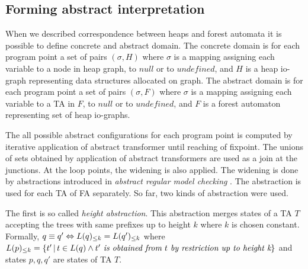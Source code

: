 \documentclass[a4paper, 12pt]{article}
\begin{document}
\subsection{Forming abstract interpretation}
When we described correspondence between heaps and forest automata
it is possible to define concrete and abstract domain.
The concrete domain is for each program point a set of pairs $(\sigma, H)$
where $\sigma$ is a mapping assigning each variable to a node in heap graph,
to $null$ or to $undefined$, and $H$ is a heap io-graph representing data
structures allocated on graph.
The abstract domain is for each program point a set of pairs $(\sigma, F)$
where $\sigma$ is a mapping assigning each variable to a TA in $F$,
to $null$ or to $undefined$, and $F$ is a forest automaton representing
set of heap io-graphs.

The all possible abstract configurations for each program point is computed by
iterative application of abstract transformer until reaching of fixpoint.
The unions of sets obtained by application of abstract transformers are used
as a join at the junctions.
At the loop points, the widening is also applied.
The widening is done by abstractions introduced in \emph{abstract regular model checking} \cite{artmc}.
The abstraction is used for each TA of FA separately.
So far, two kinds of abstraction were used.

The first is so called \emph{height abstraction}.
This abstraction merges states of a TA $T$ accepting the trees with same prefixes
up to height $k$ where $k$ is chosen constant.
Formally, $q \equiv q' \Leftrightarrow L(q)_{\leq k} = L(q')_{\leq k}$
where $L(p)_{\leq k} = \{t'\,|\, t \in L(q) \wedge t' \emph{ is obtained from } t \emph{ by restriction up to height k}\}$
and states $p,q,q'$ are states of TA $T$.
\end{document}
